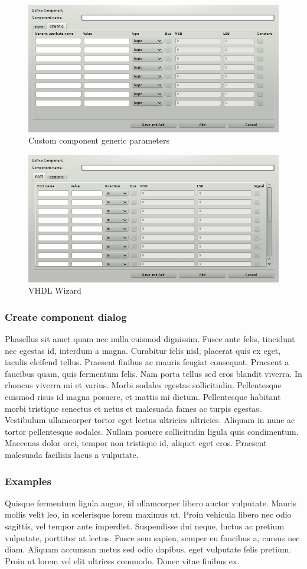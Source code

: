 \begin{figure}[h]
    \centering
    \includegraphics[width=.5\textwidth]{img/VHDL_create_generic.png}
    \caption{Custom component generic parameters}
\end{figure}

\begin{figure}[h]
    \centering
    \includegraphics[width=.5\textwidth]{img/VHDL_create_component.png}
    \caption{VHDL Wizard}
\end{figure}


\subsubsection{Create component dialog}
    Phasellus sit amet quam nec nulla euismod dignissim. Fusce ante felis, tincidunt nec egestas id, interdum a magna. Curabitur felis nisl, placerat quis ex eget, iaculis eleifend tellus. Praesent finibus ac mauris feugiat consequat. Praesent a faucibus quam, quis fermentum felis. Nam porta tellus sed eros blandit viverra. In rhoncus viverra mi et varius. Morbi sodales egestas sollicitudin. Pellentesque euismod risus id magna posuere, et mattis mi dictum. Pellentesque habitant morbi tristique senectus et netus et malesuada fames ac turpis egestas. Vestibulum ullamcorper tortor eget lectus ultricies ultricies. Aliquam in nunc ac tortor pellentesque sodales. Nullam posuere sollicitudin ligula quis condimentum. Maecenas dolor orci, tempor non tristique id, aliquet eget eros. Praesent malesuada facilisis lacus a vulputate.

\subsubsection{Examples}
    Quisque fermentum ligula augue, id ullamcorper libero auctor vulputate. Mauris mollis velit leo, in scelerisque lorem maximus ut. Proin vehicula libero nec odio sagittis, vel tempor ante imperdiet. Suspendisse dui neque, luctus ac pretium vulputate, porttitor at lectus. Fusce sem sapien, semper eu faucibus a, cursus nec diam. Aliquam accumsan metus sed odio dapibus, eget vulputate felis pretium. Proin ut lorem vel elit ultrices commodo. Donec vitae finibus ex.